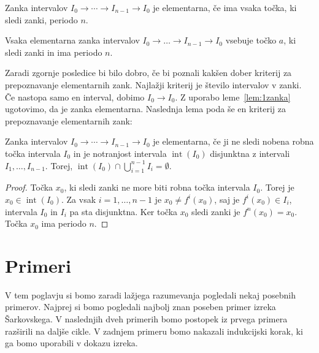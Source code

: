 \documentclass[mat2]{fmfdelo}
\DeclareMathOperator{\interior}{int}
\begin{document}
\begin{definicija}\label{def:element}
Zanka intervalov $I_0 \to \cdots \to I_{n-1} \to I_0$ je elementarna, če ima vsaka točka, ki sledi zanki, periodo $n$.
\end{definicija}

\begin{posledica}
Vsaka elementarna zanka intervalov $I_0 \to \dots \to I_{n-1} \to I_0$ vsebuje točko $a$, ki sledi zanki in ima periodo $n$.
\end{posledica}

Zaradi zgornje posledice bi bilo dobro, če bi poznali kakšen dober kriterij za prepoznavanje elementarnih zank. Najlažji kriterij je število intervalov v zanki. Če nastopa samo en interval, dobimo $I_0 \to I_0$. Z uporabo leme~\ref{lem:1zanka} ugotovimo, da je zanka elementarna. Naslednja lema poda še en kriterij za prepoznavanje elementarnih zank:

\begin{lema}\label{lem:element}
Zanka intervalov $I_0 \to \cdots \to I_{n-1} \to I_0$ je elementarna, če ji ne sledi nobena robna točka intervala $I_0$ in je notranjost intervala $\interior(I_0)$ disjunktna z intervali $I_1, \dots, I_{n-1}$. Torej, $\interior(I_0) \cap \bigcup_{i=1}^{n-1}I_i = \emptyset$.
\end{lema}
\begin{proof}
Točka $x_0$, ki sledi zanki ne more biti robna točka intervala $I_0$. Torej je $x_0 \in \interior(I_0)$. Za vsak $i=1, \dots, n-1$ je $x_0 \neq f^i(x_0)$, saj je $f^i(x_0) \in I_i$, intervala $I_0$ in $I_i$ pa sta disjunktna. Ker točka $x_0$ sledi zanki je $f^n(x_0)=x_0$. Točka $x_0$ ima periodo $n$.
\end{proof}

\section{Primeri}%
V tem poglavju si bomo zaradi lažjega razumevanja pogledali nekaj posebnih primerov. Najprej si bomo pogledali najbolj znan poseben primer izreka Šarkovskega. V naslednjih dveh primerih bomo postopek iz prvega primera razširili na daljše cikle. V zadnjem primeru bomo nakazali indukcijski korak, ki ga bomo uporabili v dokazu izreka.
\end{document}

